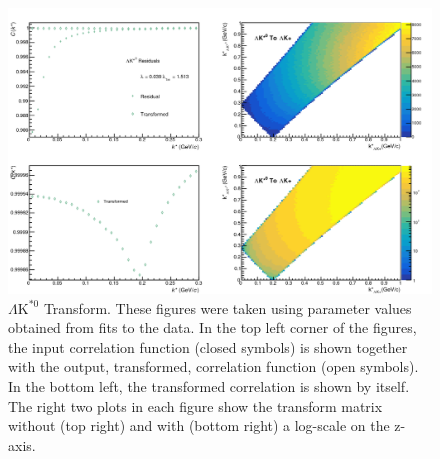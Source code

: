 \documentclass[/home/jesse/Analysis/FemtoAnalysis/AnalysisNotes/AnalysisNoteJBuxton.tex]{subfiles}
\begin{document}
\begin{figure}[h]
  \centering
  \includegraphics[width=\textwidth]{5_Fitting/Figures/Residuals_LamKchP_0010_LamKSt0_MomResCrctn_NonFlatBgdCrctn_10Res_PrimMaxDecay4fm_UsingXiDataAndCoulombOnly.pdf}
  \caption[$\Lambda\mathrm{K^{*0}}$ Transform]{$\Lambda\mathrm{K^{*0}}$ Transform.  These figures were taken using parameter values obtained from fits to the data.  In the top left corner of the figures, the input correlation function (closed symbols) is shown together with the output, transformed, correlation function (open symbols).  In the bottom left, the transformed correlation is shown by itself.  The right two plots in each figure show the transform matrix without (top right) and with (bottom right) a log-scale on the z-axis.}
  \label{fig:LamKSt0toLamKchPTransform}
\end{figure}

\clearpage
\end{document}

